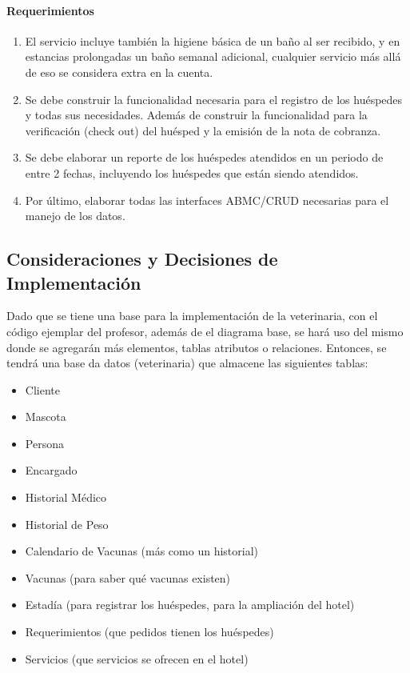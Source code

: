 \documentclass[
  12pt,
  hidelinks,
  a4paper,
  headings=standardclasses,
  headings=big,
  spanish
]{scrartcl}
\begin{document}
\paragraph{Requerimientos}

\begin{enumerate}
  \item El servicio incluye también la higiene básica de un baño al ser recibido, y en estancias prolongadas un baño semanal adicional, cualquier servicio más allá de eso se considera extra en la cuenta.
  \item Se debe construir la funcionalidad necesaria para el registro de los huéspedes y todas sus necesidades.
  Además de construir la funcionalidad para la verificación (check out) del huésped y la emisión de la nota de cobranza.
  \item Se debe elaborar un reporte de los huéspedes atendidos en un periodo de entre 2 fechas, incluyendo los huéspedes que están siendo atendidos.
  \item Por último, elaborar todas las interfaces ABMC/CRUD necesarias para el manejo de los datos.
\end{enumerate}

\subsection{Consideraciones y Decisiones de Implementación}

Dado que se tiene una base para la implementación de la veterinaria, con el código ejemplar del profesor, además de el diagrama base, se hará uso del mismo donde se agregarán más elementos, tablas atributos o relaciones.
Entonces, se tendrá una base da datos (veterinaria) que almacene las siguientes tablas:
\begin{itemize}
  \item Cliente
  \item Mascota
  \item Persona
  \item Encargado
  \item Historial Médico
  \item Historial de Peso
  \item Calendario de Vacunas (más como un historial)
  \item Vacunas (para saber qué vacunas existen)
  \item Estadía (para registrar los huéspedes, para la ampliación del hotel)
  \item Requerimientos (que pedidos tienen los huéspedes)
  \item Servicios (que servicios se ofrecen en el hotel)
\end{itemize}
\end{document}
